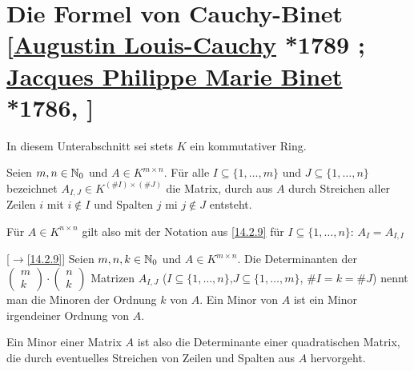 \documentclass[../../main.tex]{subfiles}
\begin{document}
\section[Die Formel von Cauchy-Binet]{Die Formel von Cauchy-Binet\\{\small[\href{https://de.wikipedia.org/wiki/Augustin-Louis_Cauchy}{Augustin Louis-Cauchy} *1789 ; \href{https://en.wikipedia.org/wiki/Jacques_Philippe_Marie_Binet}{Jacques Philippe Marie Binet} *1786, ]}}

In diesem Unterabschnitt sei stets $K$ ein kommutativer Ring.

\begin{df}\label{17.2.1}
Seien $m,n\in \mathbb N_0$ und $A\in K^{m\times n}$. Für alle $I\subseteq\{1,\ldots ,m\}$ und $J\subseteq\{1,\ldots ,n\}$ bezeichnet $A_{I,J}\in K^{(\#I)\times (\#J)}$ die Matrix, durch aus $A$ durch Streichen aller Zeilen $i$ mit $i\notin I$ und Spalten $j$ mi $j\notin J$ entsteht.
\end{df}

\begin{bem}\label{17.2.2}
Für $A\in K^{n\times n}$ gilt also mit der Notation aus \ref{14.2.9} für $I\subseteq\{1,\ldots ,n\}$: $A_I=A_{I,I}$
\end{bem}

\begin{df}\mbox{}[$\to$\ref{14.2.9}]
\label{17.2.3}
Seien $m,n,k\in \mathbb N_0$ und $A\in K^{m\times n}$. Die Determinanten der $\begin{pmatrix*}m\\k\end{pmatrix*}\cdot\begin{pmatrix*}n\\k\end{pmatrix*}$ Matrizen $A_{I,J}$ ($I\subseteq\{1,\ldots ,n\}$,$J\subseteq\{1,\ldots ,m\}$, $\# I=k=\# J$) nennt man die Minoren der Ordnung $k$ von $A$. Ein Minor von  $A$ ist ein Minor irgendeiner Ordnung von $A$.
\end{df}

\begin{bem}\label{17.2.4}
Ein Minor einer Matrix $A$ ist also die Determinante einer quadratischen Matrix, die durch eventuelles Streichen von Zeilen und Spalten aus $A$ hervorgeht.
\end{bem}
\end{document}
